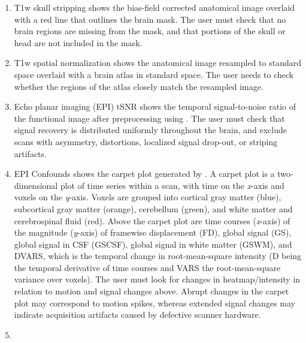 \begin{enumerate}[leftmargin=*]

\item

T1w skull stripping shows the bias-field corrected anatomical image
overlaid with a red line that outlines the brain mask. The user must check
that no brain regions are missing from the mask, and that portions of the
skull or head are not included in the mask.

\item

T1w spatial normalization shows the anatomical image resampled to standard
space overlaid with a brain atlas in standard space. The user needs to
check whether the regions of the atlas closely match the resampled image.

\item

Echo planar imaging (EPI) tSNR shows the temporal signal-to-noise ratio of
the functional image after preprocessing using . The user
must check that signal recovery is distributed uniformly throughout the
brain, and exclude scans with asymmetry, distortions, localized signal
drop-out, or striping artifacts.

\item

EPI Confounds shows the carpet plot
\parencite{10.1016/j.neuroimage.2016.08.009,10.1016/j.neuroimage.2020.116614}
generated by . A carpet plot is a two-dimensional plot of
time series within a scan, with time on the \emph{x}-axis and voxels on the
\emph{y}-axis. Voxels are grouped into cortical gray matter (blue),
subcortical gray matter (orange), cerebellum (green), and white matter and
cerebrospinal fluid (red). Above the carpet plot are time courses (\emph{x}-axis)
of the magnitude (\emph{y}-axis) of framewise displacement (FD), global signal
(GS), global signal in CSF (GSCSF), global signal in white matter (GSWM),
and DVARS, which is the temporal change in root-mean-square intensity (D being the
temporal derivative of time courses and VARS the root-mean-square variance
over voxels). The user must look for changes in heatmap/intensity in
relation to motion and signal changes above. Abrupt changes in the carpet
plot may correspond to motion spikes, whereas extended signal changes may
indicate acquisition artifacts caused by defective scanner hardware.

\item


\end{enumerate}

